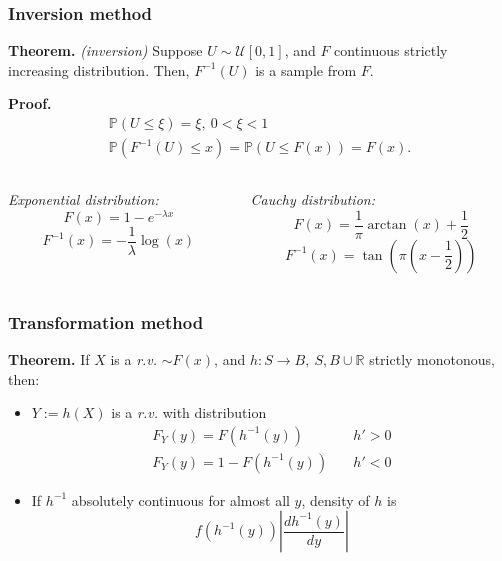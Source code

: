 \documentclass[10pt, serif, mathserif]{beamer}
\begin{document}
\begin{frame}
  \frametitle{Inversion method}
  \textbf{Theorem.} \emph{(inversion)} Suppose $U \sim\mathcal{U}[0,1]$, and $F$ continuous strictly increasing distribution. Then,
    $F^{-1}(U)$ is a sample from $F$.

  \textbf{Proof.} \begin{gather*} 
    \mathbb{P}(U \leq \xi) = \xi,\ 0 < \xi < 1 \\
    \mathbb{P}(F^{-1}(U)\leq x) = \mathbb{P}(U \leq F(x)) = F(x).
  \end{gather*}
  \begin{columns}[t]
    \begin{column}{5cm}
      \centering \emph{Exponential distribution:}
      \[ F(x) = 1 - e^{-\lambda x}\]
      \[ F^{-1}(x) = -\frac{1}{\lambda} \log(x)\]
    \end{column}

    \begin{column}{5cm}
      \centering \emph{Cauchy distribution:}
      \[ F(x) = \frac{1}{\pi} \arctan(x) + \frac{1}{2} \]
      \[ F^{-1}(x) = \tan\left(\pi\left(x - \frac{1}{2}\right)\right)\]
    \end{column}
  \end{columns}
\end{frame}

\begin{frame}
  \frametitle{Transformation method}
  \textbf{Theorem.} If $X$ is a \emph{r.v.} $\sim F(x)$, and $h : S \to B,\ S,B\cup \mathbb{R}$ strictly monotonous, then:
  \medskip
  \begin{itemize}
    \item $Y := h(X)$ is a \emph{r.v.} with distribution
      \begin{align*} 
        F_Y(y) = F(h^{-1}(y)) & \quad h' > 0 \\
        F_Y(y) = 1 - F(h^{-1}(y)) & \quad h' < 0 
      \end{align*}
    \item If $h^{-1}$ absolutely continuous for almost all $y$, density of $h$ is
      \[
        f(h^{-1}(y)) \left| \frac{dh^{-1}(y)}{dy}\right|
      \]
  \end{itemize}
\end{frame}
\end{document}
